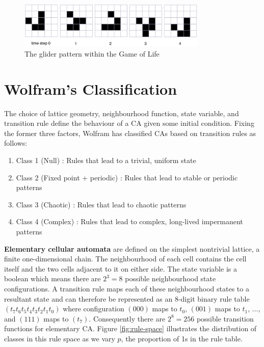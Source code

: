 \begin{figure}[!h]
\centering
\includegraphics[width=0.8\textwidth]{images/life-glider.png}
\caption{The glider pattern within the Game of Life \cite{dorin2012framework}}
\label{fig:life-glider}
\end{figure}

\section{Wolfram's Classification}

The choice of lattice geometry, neighbourhood function, state variable, and transition rule define the behaviour of a CA given some initial condition. Fixing the former three factors, Wolfram \cite{wolfram1986theory} has classified CAs based on transition rules as follows:
\begin{enumerate}
  \item Class 1 (Null) : Rules that lead to a trivial, uniform state
  \item Class 2 (Fixed point + periodic) : Rules that lead to stable or periodic patterns
  \item Class 3 (Chaotic) : Rules that lead to chaotic patterns
  \item Class 4 (Complex) : Rules that lead to complex, long-lived impermanent patterns
\end{enumerate}

\textbf{Elementary cellular automata} are defined on the simplest nontrivial lattice, a finite one-dimensional chain. The neighbourhood of each cell contains the cell itself and the two cells adjacent to it on either side. The state variable is a boolean which means there are $2^3 = 8$ possible neighbourhood state configurations. A transition rule maps each of these neighbourhood states to a resultant state and can therefore be represented as an 8-digit binary rule table $(t_7t_6t_5t_4t_3t_2t_1t_0)$ where configuration $(000)$ maps to $t_0$, $(001)$ maps to $t_1$, ..., and $(111)$ maps to $(t_7)$. Consequently there are $2^8=256$ possible transition functions for elementary CA. Figure \ref{fig:rule-space} illustrates the distribution of classes in this rule space as we vary $p$, the proportion of 1s in the rule table. \\

